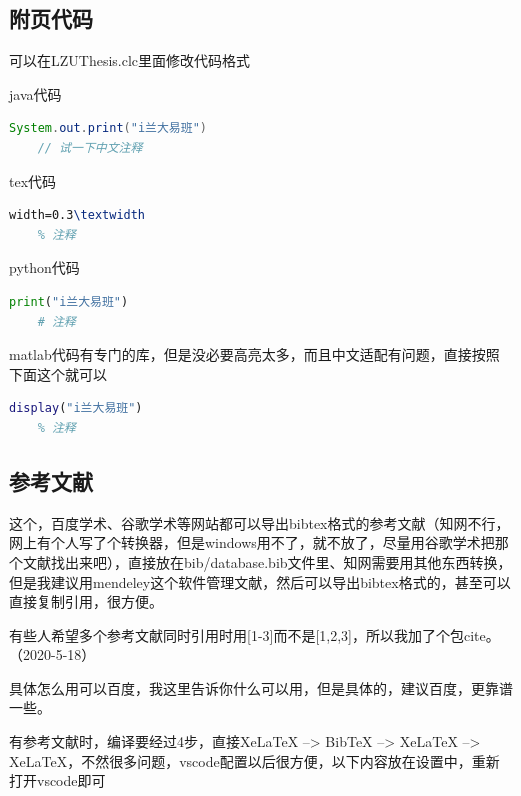 \documentclass[AutoFakeBold]{LZUThesis2007}
\begin{document}


\subsection{附页代码} %
\label{sub:附页代码}
可以在LZUThesis.clc里面修改代码格式

java代码
\begin{lstlisting}[language = java]
    System.out.print("i兰大易班")
    // 试一下中文注释
\end{lstlisting}


tex代码
\begin{lstlisting}[language = tex]
    width=0.3\textwidth
    % 注释
\end{lstlisting}

python代码
\begin{lstlisting}[language = python]
    print("i兰大易班")
    # 注释
\end{lstlisting}

matlab代码有专门的库，但是没必要高亮太多，而且中文适配有问题，直接按照下面这个就可以
\begin{lstlisting}[language = matlab]
    display("i兰大易班")
    % 注释
\end{lstlisting}


\subsection{参考文献} %
\label{sub:参考文献}

这个，百度学术、谷歌学术等网站都可以导出bibtex格式的参考文献（知网不行，网上有个人写了个转换器，但是windows用不了，就不放了，尽量用谷歌学术把那个文献找出来吧），直接放在bib/database.bib文件里、知网需要用其他东西转换，但是我建议用mendeley这个软件管理文献，然后可以导出bibtex格式的，甚至可以直接复制引用，很方便\cite{partl2016, tenne1992polyhedral, tussyadiah2015hotels}。

有些人希望多个参考文献同时引用时用[1-3]而不是[1,2,3]，所以我加了个包cite。（2020-5-18）

具体怎么用可以百度，我这里告诉你什么可以用，但是具体的，建议百度，更靠谱一些。


有参考文献时，编译要经过4步，直接XeLaTeX --> BibTeX --> XeLaTeX --> XeLaTeX，不然很多问题，vscode配置以后很方便，以下内容放在设置中，重新打开vscode即可



\end{document}
